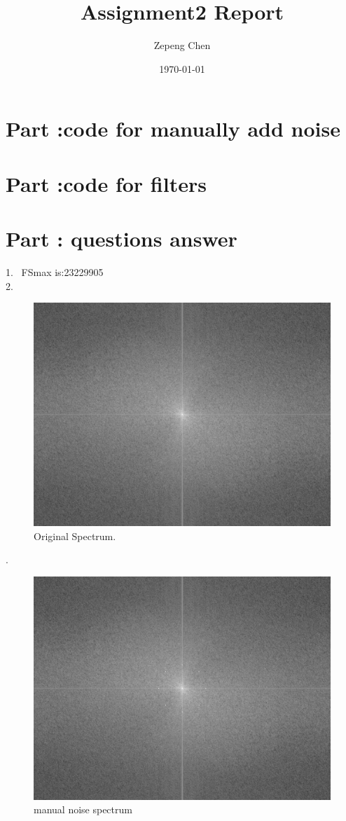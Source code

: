 \documentclass[14pt]{article}
\title{Assignment2 Report}
\author{Zepeng Chen}
\date{\today}
\begin{document}
	\maketitle
	\tableofcontents
	\newcommand{\RNum}[1]{\uppercase\expandafter{\romannumeral #1\relax}}
	\section{Part \RNum{1}:code for manually add noise}
	
	\section{Part \RNum{2}:code for filters}
	
	\section{Part \RNum{3}: questions answer}
		1.~	FSmax is:23229905\\
		2.~
			\begin{figure}[hbt!]
				\centering
				\includegraphics[width=\linewidth]{ori_spec.png}
				\caption{Original Spectrum.}
			\end{figure}
		.~
			\begin{figure}[hbt!]
				\centering
				\includegraphics[width=\linewidth]{noise_added_spec.png}
				\caption{manual noise spectrum}
			\end{figure}
\end{document}

